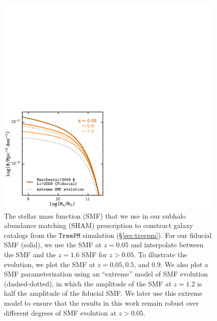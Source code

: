 \begin{figure}
\begin{center}
\includegraphics[width=\textwidth]{figs/cenq/SMF_evol.pdf}
\caption{The stellar mass function (SMF) that we use in 
our subhalo abundance matching (SHAM) prescription to construct 
galaxy catalogs from the \cite{Wetzel:2013aa} $\mathtt{TreePM}$ 
simulation (\S \ref{sec:treepm}). For our fiducial 
SMF (solid), we use the \cite{Li:2009aa} SMF at $z = 0.05$ and 
interpolate between the \cite{Li:2009aa} SMF and the 
\cite{Marchesini:2009aa} $z = 1.6$ SMF for $z > 0.05$. To illustrate 
the evolution, we plot the SMF at $z=0.05, 0.5$, and $0.9$.
We also plot a SMF parameterization using an ``extreme''
model of SMF evolution (dashed-dotted), in which the amplitude
of the SMF at $z = 1.2$ is half the amplitude of the fiducial SMF. 
We later use this extreme model to ensure that the results in this 
work remain robust over different degrees of SMF evolution at 
$z > 0.05$.}
\label{fig:smf_evol}
\end{center}
\end{figure}

